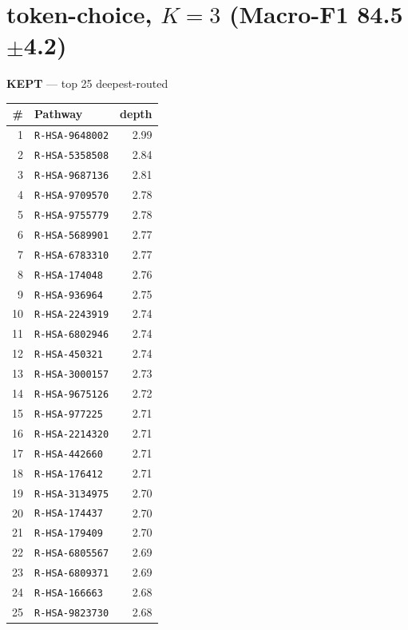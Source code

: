 \documentclass[10pt]{article}
\begin{document}
\section*{token-choice, $K=3$  (Macro-F1 84.5$\pm$4.2)}
\filbreak
\begin{minipage}[t]{0.48\textwidth}\centering\textbf{\color{green!45!black}KEPT} --- top 25 deepest-routed\\[3pt]
\begin{tabular}{@{}r l r@{}}
\toprule
\# & Pathway & depth \\
\midrule
1 & \texttt{R-HSA-9648002} & 2.99 \\
2 & \texttt{R-HSA-5358508} & 2.84 \\
3 & \texttt{R-HSA-9687136} & 2.81 \\
4 & \texttt{R-HSA-9709570} & 2.78 \\
5 & \texttt{R-HSA-9755779} & 2.78 \\
6 & \texttt{R-HSA-5689901} & 2.77 \\
7 & \texttt{R-HSA-6783310} & 2.77 \\
8 & \texttt{R-HSA-174048} & 2.76 \\
9 & \texttt{R-HSA-936964} & 2.75 \\
10 & \texttt{R-HSA-2243919} & 2.74 \\
11 & \texttt{R-HSA-6802946} & 2.74 \\
12 & \texttt{R-HSA-450321} & 2.74 \\
13 & \texttt{R-HSA-3000157} & 2.73 \\
14 & \texttt{R-HSA-9675126} & 2.72 \\
15 & \texttt{R-HSA-977225} & 2.71 \\
16 & \texttt{R-HSA-2214320} & 2.71 \\
17 & \texttt{R-HSA-442660} & 2.71 \\
18 & \texttt{R-HSA-176412} & 2.71 \\
19 & \texttt{R-HSA-3134975} & 2.70 \\
20 & \texttt{R-HSA-174437} & 2.70 \\
21 & \texttt{R-HSA-179409} & 2.70 \\
22 & \texttt{R-HSA-6805567} & 2.69 \\
23 & \texttt{R-HSA-6809371} & 2.69 \\
24 & \texttt{R-HSA-166663} & 2.68 \\
25 & \texttt{R-HSA-9823730} & 2.68 \\
\bottomrule
\end{tabular}
\end{minipage}\hfill
\end{document}
